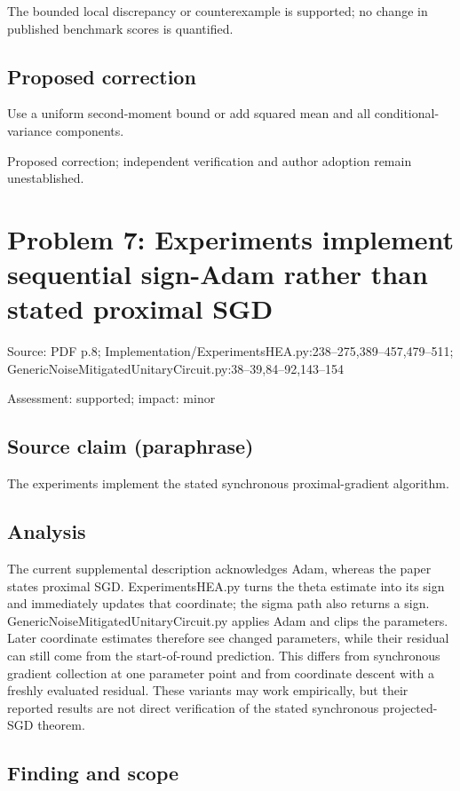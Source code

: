 \documentclass[11pt]{article}
\begin{document}
The bounded local discrepancy or counterexample is supported; no change in published benchmark scores is quantified.

\subsection*{Proposed correction}

Use a uniform second-moment bound or add squared mean and all conditional-variance components.

Proposed correction; independent verification and author adoption remain unestablished.

\section*{Problem 7: Experiments implement sequential sign-Adam rather than stated proximal SGD}

Source: PDF p.8; Implementation/ExperimentsHEA.py:238–275,389–457,479–511; GenericNoiseMitigatedUnitaryCircuit.py:38–39,84–92,143–154

Assessment: supported; impact: minor

\subsection*{Source claim (paraphrase)}

The experiments implement the stated synchronous proximal-gradient algorithm.

\subsection*{Analysis}

The current supplemental description acknowledges Adam, whereas the paper states proximal SGD. ExperimentsHEA.py turns the theta estimate into its sign and immediately updates that coordinate; the sigma path also returns a sign. GenericNoiseMitigatedUnitaryCircuit.py applies Adam and clips the parameters. Later coordinate estimates therefore see changed parameters, while their residual can still come from the start-of-round prediction. This differs from synchronous gradient collection at one parameter point and from coordinate descent with a freshly evaluated residual. These variants may work empirically, but their reported results are not direct verification of the stated synchronous projected-SGD theorem.

\subsection*{Finding and scope}
\end{document}
